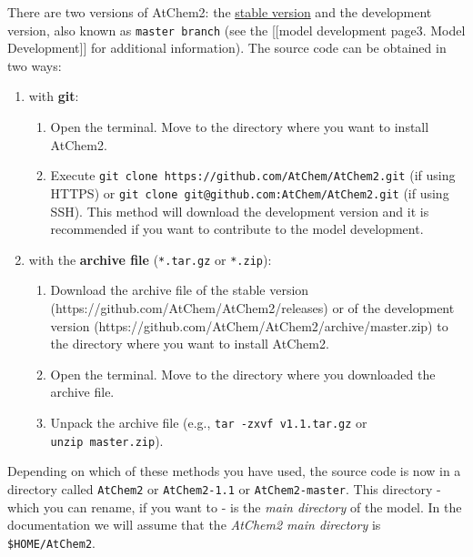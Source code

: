 There are two versions of AtChem2: the
\href{https://github.com/AtChem/AtChem2/releases}{stable version} and
the development version, also known as \texttt{master\ branch} (see the
{[}{[}model development page\textbar{}3. Model Development{]}{]} for
additional information). The source code can be obtained in two ways:

\begin{enumerate}
\def\labelenumi{\arabic{enumi}.}
\item
  with \textbf{git}:

  \begin{enumerate}
  \def\labelenumii{\arabic{enumii}.}
    \item
    Open the terminal. Move to the directory where you want to install
    AtChem2.
  \item
    Execute \texttt{git\ clone\ https://github.com/AtChem/AtChem2.git}
    (if using HTTPS) or
    \texttt{git\ clone\ git@github.com:AtChem/AtChem2.git} (if using
    SSH). This method will download the development version and it is
    recommended if you want to contribute to the model development.
  \end{enumerate}
\item
  with the \textbf{archive file} (\texttt{*.tar.gz} or \texttt{*.zip}):

  \begin{enumerate}
  \def\labelenumii{\arabic{enumii}.}
    \item
    Download the archive file of the stable version
    (https://github.com/AtChem/AtChem2/releases) or of the development
    version (https://github.com/AtChem/AtChem2/archive/master.zip) to
    the directory where you want to install AtChem2.
  \item
    Open the terminal. Move to the directory where you downloaded the
    archive file.
  \item
    Unpack the archive file (e.g., \texttt{tar\ -zxvf\ v1.1.tar.gz} or
    \texttt{unzip\ master.zip}).
  \end{enumerate}
\end{enumerate}

Depending on which of these methods you have used, the source code is
now in a directory called \texttt{AtChem2} or \texttt{AtChem2-1.1} or
\texttt{AtChem2-master}. This directory - which you can rename, if you
want to - is the \emph{main directory} of the model. In the
documentation we will assume that the \emph{AtChem2 main directory} is
\texttt{\$HOME/AtChem2}.

